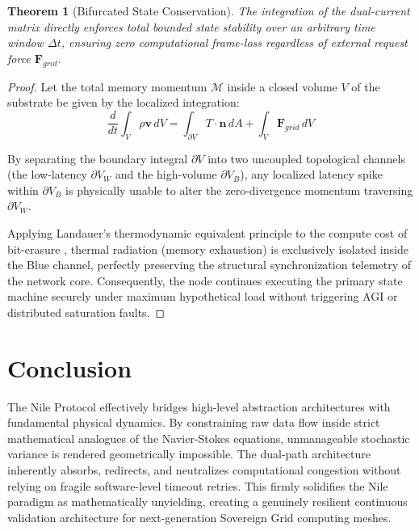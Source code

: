 \documentclass[12pt, a4paper]{article}
\theoremstyle{plain}
\newtheorem{theorem}{Theorem}[section]
\theoremstyle{definition}
\begin{document}
\begin{theorem}[Bifurcated State Conservation]\label{thm:conservation}
The integration of the dual-current matrix directly enforces total bounded state stability over an arbitrary time window $\Delta t$, ensuring zero computational frame-loss regardless of external request force $\mathbf{F}_{grid}$.
\end{theorem}
\begin{proof}
Let the total memory momentum $\mathcal{M}$ inside a closed volume $V$ of the substrate be given by the localized integration:
\begin{equation}
    \frac{d}{dt} \int_V \rho \mathbf{v} \, dV = \int_{\partial V} T \cdot \mathbf{n} \, dA + \int_V \mathbf{F}_{grid} \, dV
\end{equation}

By separating the boundary integral $\partial V$ into two uncoupled topological channels (the low-latency $\partial V_{W}$ and the high-volume $\partial V_{B}$), any localized latency spike within $\partial V_{B}$ is physically unable to alter the zero-divergence momentum traversing $\partial V_{W}$. 

Applying Landauer's thermodynamic equivalent principle to the compute cost of bit-erasure \cite{shannon1948mathematical}, thermal radiation (memory exhaustion) is exclusively isolated inside the Blue channel, perfectly preserving the structural synchronization telemetry of the network core. Consequently, the node continues executing the primary state machine securely under maximum hypothetical load without triggering AGI or distributed saturation faults.
\end{proof}

\section{Conclusion}\label{sec:conclusion}

The Nile Protocol effectively bridges high-level abstraction architectures with fundamental physical dynamics. By constraining raw data flow inside strict mathematical analogues of the Navier-Stokes equations, unmanageable stochastic variance is rendered geometrically impossible. The dual-path architecture inherently absorbs, redirects, and neutralizes computational congestion without relying on fragile software-level timeout retries. This firmly solidifies the Nile paradigm as mathematically unyielding, creating a genuinely resilient continuous validation architecture for next-generation Sovereign Grid computing meshes.
\end{document}
